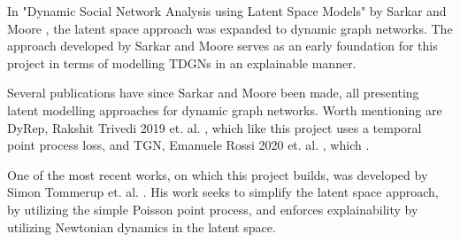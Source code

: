 In "Dynamic Social Network Analysis using Latent Space Models" by Sarkar and Moore \cite{Sarkar2005DynamicModels}, the latent space approach was expanded to dynamic graph networks.
The approach developed by Sarkar and Moore serves as an early foundation for this project in terms of modelling TDGNs in an explainable manner.

Several publications have since Sarkar and Moore been made, all presenting latent modelling approaches for dynamic graph networks. 
Worth mentioning are DyRep, Rakshit Trivedi 2019 et. al. \cite{TrivediDYREP:GRAPHS}, which like this project uses a temporal point process loss, and TGN, Emanuele Rossi 2020 et. al. \cite{RossiTEMPORALGRAPHS}, which .
 
One of the most recent works, on which this project builds, was developed by Simon Tommerup et. al. \cite{Tommerup2021LearningNetworks}.
His work seeks to simplify the latent space approach, by utilizing the simple Poisson point process, and enforces explainability by utilizing Newtonian dynamics in the latent space.




